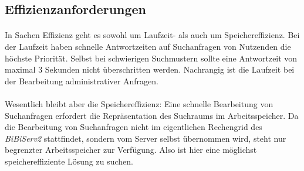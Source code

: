 \subsection{Effizienzanforderungen}

\paragraph{} In Sachen Effizienz geht es sowohl um Laufzeit- als auch um Speichereffizienz. Bei der Laufzeit haben schnelle Antwortzeiten auf Suchanfragen von Nutzenden die höchste Priorität. Selbst bei schwierigen Suchmustern sollte eine Antwortzeit von maximal 3 Sekunden nicht überschritten werden. Nachrangig ist die Laufzeit bei der Bearbeitung administrativer Anfragen.
\paragraph{} Wesentlich bleibt aber die Speichereffizienz: Eine schnelle Bearbeitung von Suchanfragen erfordert die Repräsentation des Suchraums im Arbeitsspeicher. Da die Bearbeitung von Suchanfragen nicht im eigentlichen Rechengrid des \textit{BiBiServ2} stattfindet, sondern vom Server selbst übernommen wird, steht nur begrenzter Arbeitsspeicher zur Verfügung. Also ist hier eine möglichst speichereffiziente Lösung zu suchen.